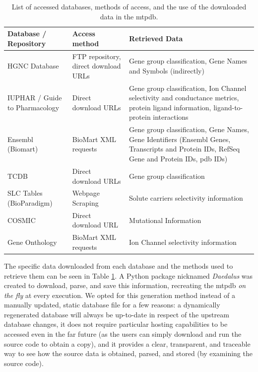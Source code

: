 \begin{table}
\begin{tabularx}{\textwidth}{|X|X|X|}
        \hline
    \textbf{Database / Repository}  & \textbf{Access method}
        & \textbf{Retrieved Data} \\
        \hline
        \hline
    HGNC Database                   & FTP repository, direct download URLs
        & Gene group classification, Gene Names and Symbols (indirectly) \\
        \hline
    IUPHAR / Guide to Pharmacology  & Direct download URLs
        & Gene group classification, Ion Channel selectivity and conductance
        metrics, protein ligand information, ligand-to-protein interactions \\
        \hline
    Ensembl (Biomart)               & BioMart XML requests
        & Gene group classification, Gene Names, Gene Identifiers (Ensembl Genes,
        Transcripts and Protein IDs, RefSeq Gene and Protein IDs, pdb IDs) \\
        \hline
    TCDB                            & Direct download URLs
        & Gene group classification \\
        \hline
    SLC Tables (BioParadigm)        & Webpage Scraping
        & Solute carriers selectivity information \\
        \hline
    COSMIC                          & Direct download URL
        & Mutational Information \\
        \hline
    Gene Onthology                  & BioMart XML requests
        & Ion Channel selectivity information \\
        \hline
\end{tabularx}
\caption{List of accessed databases, methods of access, and the use of the
    downloaded data in the \acrlong{mtpdb}.}
\label{tab:dataSources}
\end{table}

The specific data downloaded from each database and the methods used to retrieve them can be seen in Table \ref{tab:dataSources}.
A Python package nicknamed \textit{Daedalus} was created to download, parse, and save this information, recreating the \gls{mtpdb} \textit{on the fly} at every execution.
We opted for this generation method instead of a manually updated, static database file for a few reasons:
a dynamically regenerated database will always be up-to-date in respect of the upstream database changes,
it does not require particular hosting capabilities to be accessed even in the far future (as the users can simply download and run the source code to obtain a copy),
and it provides a clear, transparent, and traceable way to see how the source data is obtained, parsed, and stored (by examining the source code).

